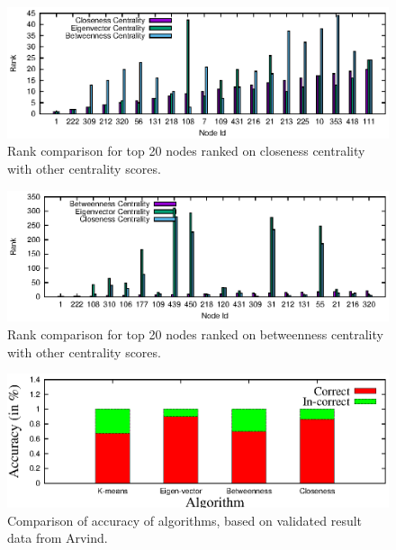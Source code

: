 \begin{figure}[!ht]
    \centering
    \includegraphics[width=1\textwidth]{figures/social-result_closeness.eps}
    \caption{Rank comparison for top 20 nodes ranked on closeness centrality with other centrality scores.}
    \label{fig:social-result-closeness}
\end{figure}

\begin{figure}[!ht]
    \centering
    \includegraphics[width=1\textwidth]{figures/social-result_betweenness.eps}
    \caption{Rank comparison for top 20 nodes ranked on betweenness centrality with other centrality scores.}
    \label{fig:social-result-betweenness}
\end{figure}

\begin{figure}[!ht]
    \centering
    \includegraphics[width=1\textwidth]{figures/social-result_arvind.eps}
    \caption{Comparison of accuracy of algorithms, based on validated result data from Arvind.}
    \label{fig:social-result-arvind}
\end{figure}

